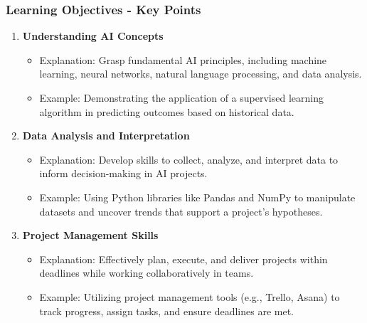 \documentclass{beamer}
\begin{document}
\begin{frame}[fragile]
    \frametitle{Learning Objectives - Key Points}
    \begin{enumerate}
        \item \textbf{Understanding AI Concepts}  
            \begin{itemize}
                \item Explanation: Grasp fundamental AI principles, including machine learning, neural networks, natural language processing, and data analysis.
                \item Example: Demonstrating the application of a supervised learning algorithm in predicting outcomes based on historical data.
            \end{itemize}
        
        \item \textbf{Data Analysis and Interpretation}  
            \begin{itemize}
                \item Explanation: Develop skills to collect, analyze, and interpret data to inform decision-making in AI projects.
                \item Example: Using Python libraries like Pandas and NumPy to manipulate datasets and uncover trends that support a project’s hypotheses.
            \end{itemize}

        \item \textbf{Project Management Skills}
            \begin{itemize}
                \item Explanation: Effectively plan, execute, and deliver projects within deadlines while working collaboratively in teams.
                \item Example: Utilizing project management tools (e.g., Trello, Asana) to track progress, assign tasks, and ensure deadlines are met.
            \end{itemize}
    \end{enumerate}
\end{frame}
\end{document}
